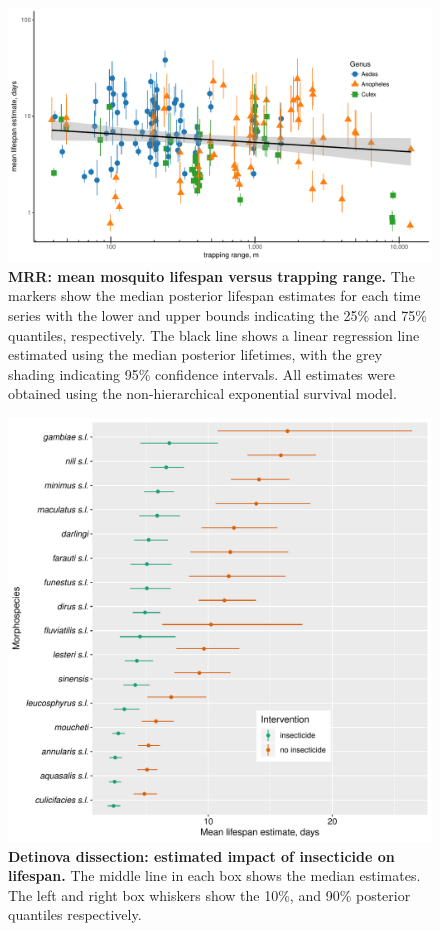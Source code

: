 \documentclass[12pt]{article}
\begin{document}
\begin{figure}[h]
	\centerline{\includegraphics[width=1\textwidth]{./Figure_files/mrr_lifeSpanVsRange.pdf}}
	\caption{\textbf{MRR: mean mosquito lifespan versus trapping range.} The markers show the median posterior lifespan estimates for each time series with the lower and upper bounds indicating the 25\% and 75\% quantiles, respectively. The black line shows a linear regression line estimated using the median posterior lifetimes, with the grey shading indicating 95\% confidence intervals. All estimates were obtained using the non-hierarchical exponential survival model.}
	\label{fig:mrr_lifeSpanVsRange}
\end{figure}

\begin{figure}[h]
	\centerline{\includegraphics[width=1\textwidth]{./Figure_files/detinova_insecticide.pdf}}
	\caption{\textbf{Detinova dissection: estimated impact of insecticide on lifespan.} The middle line in each box shows the median estimates. The left and right box whiskers show the 10\%, and 90\% posterior quantiles respectively.}
	\label{fig:detinova_insecticide}
\end{figure}
\end{document}
